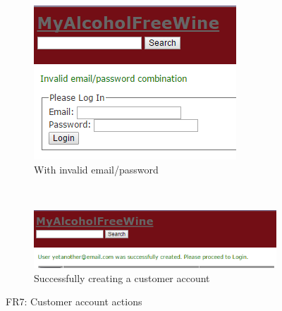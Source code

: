 \documentclass[12pt]{article}
\begin{document}
\begin{figure}[H]
    \centering
    \begin{subfigure}[b]{0.4\textwidth}
        \includegraphics[width=\textwidth]{assets/FR7_screen_3}
        \caption{With invalid email/password}
        \label{fig:FR7 Bad data}
    \end{subfigure}
    ~ %
    \begin{subfigure}[b]{0.4\textwidth}
        \includegraphics[width=\textwidth]{assets/FR7_screen_6}
        \caption{Successfully creating a customer account}
        \label{fig:FR7 Duplicate email}
    \end{subfigure}
    \caption{FR7: Customer account actions}\label{fig:FR7 Customer Account 2}
\end{figure}
\end{document}
